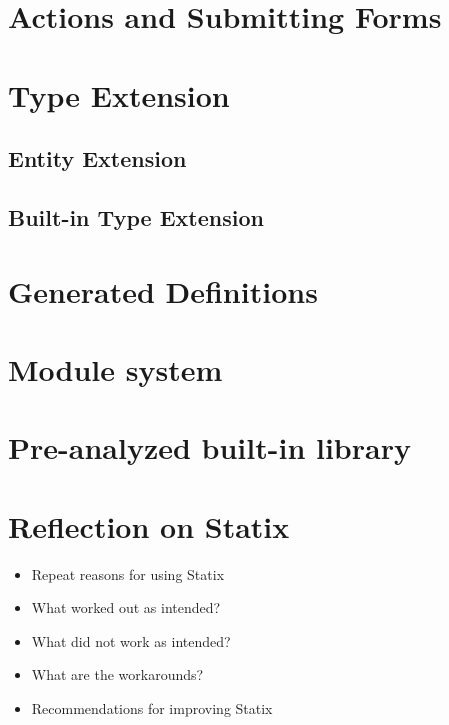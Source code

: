   \section{\label{sec:actions-and-submitting-forms}Actions and Submitting Forms}

  \section{\label{sec:type-extension}Type Extension}

    \subsection{\label{subsec:entity-extension}Entity Extension}

    \subsection{\label{subsec:built-in-extension}Built-in Type Extension}

  \section{\label{sec:generated-definitions}Generated Definitions}

  \section{\label{sec:module-system}Module system}

  \section{\label{sec:built-in-library}Pre-analyzed built-in library}

  \section{\label{sec:statix-reflection}Reflection on Statix}

    \begin{itemize}
      \item Repeat reasons for using Statix
      \item What worked out as intended?
      \item What did not work as intended?
      \item What are the workarounds?
      \item Recommendations for improving Statix
    \end{itemize}
